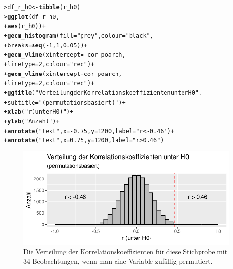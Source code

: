 \documentclass[oneside, 10pt]{book}\usepackage[]{graphicx}\usepackage[]{xcolor}
\makeatletter
\newcommand{\hlnum}[1]{\textcolor[rgb]{0.686,0.059,0.569}{#1}}%
\newcommand{\hlstr}[1]{\textcolor[rgb]{0.192,0.494,0.8}{#1}}%
\newcommand{\hlopt}[1]{\textcolor[rgb]{0,0,0}{#1}}%
\newcommand{\hlstd}[1]{\textcolor[rgb]{0.345,0.345,0.345}{#1}}%
\newcommand{\hlkwb}[1]{\textcolor[rgb]{0.69,0.353,0.396}{#1}}%
\newcommand{\hlkwc}[1]{\textcolor[rgb]{0.333,0.667,0.333}{#1}}%
\newcommand{\hlkwd}[1]{\textcolor[rgb]{0.737,0.353,0.396}{\textbf{#1}}}%
\newenvironment{kframe}{%
 \def\at@end@of@kframe{}%
 \ifinner\ifhmode%
  \def\at@end@of@kframe{\end{minipage}}%
  \begin{minipage}{\columnwidth}%
 \fi\fi%
 \def\FrameCommand##1{\hskip\@totalleftmargin \hskip-\fboxsep
 \colorbox{shadecolor}{##1}\hskip-\fboxsep
     \hskip-\linewidth \hskip-\@totalleftmargin \hskip\columnwidth}%
 \MakeFramed {\advance\hsize-\width
   \@totalleftmargin\z@ \linewidth\hsize
   \@setminipage}}%
 {\par\unskip\endMakeFramed%
 \at@end@of@kframe}
\newenvironment{knitrout}{}{} %
\makeatother
\begin{document}
\begin{knitrout}
\color{fgcolor}\begin{kframe}
\begin{alltt}
\hlstd{> }\hlstd{df_r_h0} \hlkwb{<-} \hlkwd{tibble}\hlstd{(r_h0)}
\hlstd{> }\hlkwd{ggplot}\hlstd{(df_r_h0,}
\hlstd{+ }       \hlkwd{aes}\hlstd{(r_h0))} \hlopt{+}
\hlstd{+ }  \hlkwd{geom_histogram}\hlstd{(}\hlkwc{fill} \hlstd{=} \hlstr{"grey"}\hlstd{,} \hlkwc{colour} \hlstd{=} \hlstr{"black"}\hlstd{,}
\hlstd{+ }                 \hlkwc{breaks} \hlstd{=} \hlkwd{seq}\hlstd{(}\hlopt{-}\hlnum{1}\hlstd{,} \hlnum{1}\hlstd{,} \hlnum{0.05}\hlstd{))} \hlopt{+}
\hlstd{+ }  \hlkwd{geom_vline}\hlstd{(}\hlkwc{xintercept} \hlstd{=} \hlopt{-}\hlstd{cor_poarch,}
\hlstd{+ }             \hlkwc{linetype} \hlstd{=} \hlnum{2}\hlstd{,} \hlkwc{colour} \hlstd{=} \hlstr{"red"}\hlstd{)} \hlopt{+}
\hlstd{+ }  \hlkwd{geom_vline}\hlstd{(}\hlkwc{xintercept} \hlstd{= cor_poarch,}
\hlstd{+ }             \hlkwc{linetype} \hlstd{=} \hlnum{2}\hlstd{,} \hlkwc{colour} \hlstd{=} \hlstr{"red"}\hlstd{)} \hlopt{+}
\hlstd{+ }  \hlkwd{ggtitle}\hlstd{(}\hlstr{"Verteilung der Korrelationskoeffizienten unter H0"}\hlstd{,}
\hlstd{+ }          \hlkwc{subtitle} \hlstd{=} \hlstr{"(permutationsbasiert)"}\hlstd{)} \hlopt{+}
\hlstd{+ }  \hlkwd{xlab}\hlstd{(}\hlstr{"r (unter H0)"}\hlstd{)} \hlopt{+}
\hlstd{+ }  \hlkwd{ylab}\hlstd{(}\hlstr{"Anzahl"}\hlstd{)} \hlopt{+}
\hlstd{+ }  \hlkwd{annotate}\hlstd{(}\hlstr{"text"}\hlstd{,} \hlkwc{x} \hlstd{=} \hlopt{-}\hlnum{0.75}\hlstd{,} \hlkwc{y} \hlstd{=} \hlnum{1200}\hlstd{,} \hlkwc{label} \hlstd{=} \hlstr{"r < -0.46"}\hlstd{)} \hlopt{+}
\hlstd{+ }  \hlkwd{annotate}\hlstd{(}\hlstr{"text"}\hlstd{,} \hlkwc{x} \hlstd{=} \hlnum{0.75}\hlstd{,} \hlkwc{y} \hlstd{=} \hlnum{1200}\hlstd{,} \hlkwc{label} \hlstd{=} \hlstr{"r > 0.46"}\hlstd{)}
\end{alltt}
\end{kframe}\begin{figure}[tp]

{\centering \includegraphics[width=.5\textwidth]{figs/unnamed-chunk-356-1} 

}

\caption{Die Verteilung der Korrelationskoeffizienten für diese Stichprobe mit 34 Beobachtungen, wenn man eine Variable zufällig permutiert.\label{fig:distributionkorrelationpermutation}}\label{fig:unnamed-chunk-356}
\end{figure}

\end{knitrout}
\end{document}

